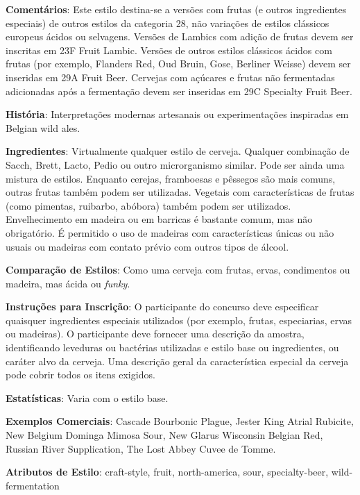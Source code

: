 \textbf{Comentários}: Este estilo destina-se a versões com frutas (e outros ingredientes especiais) de outros estilos da categoria 28, não variações de estilos clássicos europeus ácidos ou selvagens. Versões de Lambics com adição de frutas devem ser inscritas em 23F Fruit Lambic. Versões de outros estilos clássicos ácidos com frutas (por exemplo, Flanders Red, Oud Bruin, Gose, Berliner Weisse) devem ser inseridas em 29A Fruit Beer. Cervejas com açúcares e frutas não fermentadas adicionadas após a fermentação devem ser inseridas em 29C Specialty Fruit Beer.

\textbf{História}: Interpretações modernas artesanais ou experimentações inspiradas em Belgian wild ales.

\textbf{Ingredientes}: Virtualmente qualquer estilo de cerveja. Qualquer combinação de Sacch, Brett, Lacto, Pedio ou outro microrganismo similar. Pode ser ainda uma mistura de estilos. Enquanto cerejas, framboesas e pêssegos são mais comuns, outras frutas também podem ser utilizadas. Vegetais com características de frutas (como pimentas, ruibarbo, abóbora) também podem ser utilizados. Envelhecimento em madeira ou em barricas é bastante comum, mas não obrigatório. É permitido o uso de madeiras com características únicas ou não usuais ou madeiras com contato prévio com outros tipos de álcool.

\textbf{Comparação de Estilos}: Como uma cerveja com frutas, ervas, condimentos ou madeira, mas ácida ou \textit{funky}.

\textbf{Instruções para Inscrição}: O participante do concurso deve especificar quaisquer ingredientes especiais utilizados (por exemplo, frutas, especiarias, ervas ou madeiras). O participante deve fornecer uma descrição da amostra, identificando leveduras ou bactérias utilizadas e estilo base ou ingredientes, ou caráter alvo da cerveja. Uma descrição geral da característica especial da cerveja pode cobrir todos os itens exigidos.

\textbf{Estatísticas}: Varia com o estilo base.

\textbf{Exemplos Comerciais}: Cascade Bourbonic Plague, Jester King Atrial Rubicite, New Belgium Dominga Mimosa Sour, New Glarus Wisconsin Belgian Red, Russian River Supplication, The Lost Abbey Cuvee de Tomme.

\textbf{Atributos de Estilo}: craft-style, fruit, north-america, sour, specialty-beer, wild-fermentation
